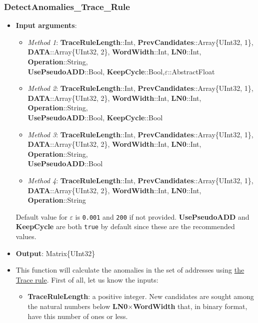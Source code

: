  \subsubsection*{DetectAnomalies\_Trace\_Rule}\label{Fun:DetectAnomaliesTraceRule}
 \begin{itemize}
	 \item \textbf{Input arguments}: 
	 \begin{itemize}
	 	\item \textit{Method 1}: \textbf{TraceRuleLength}::Int, 
	 	\textbf{PrevCandidates}::Array\{UInt32, 1\}, \\ \textbf{DATA}::Array\{UInt32, 2\}, \textbf{WordWidth}::Int, \textbf{LN0}::Int,  \textbf{Operation}::String, \\ \textbf{UsePseudoADD}::Bool, \textbf{KeepCycle}::Bool,\textbf{\(\varepsilon\)}::AbstractFloat
	 	\item \textit{Method 2}: \textbf{TraceRuleLength}::Int,
	 	\textbf{PrevCandidates}::Array\{UInt32, 1\}, \\ \textbf{DATA}::Array\{UInt32, 2\}, \textbf{WordWidth}::Int, \textbf{LN0}::Int,  \textbf{Operation}::String, \\ \textbf{UsePseudoADD}::Bool, \textbf{KeepCycle}::Bool
	 	\item \textit{Method 3}: \textbf{TraceRuleLength}::Int,
	 	\textbf{PrevCandidates}::Array\{UInt32, 1\}, \\ \textbf{DATA}::Array\{UInt32, 2\}, \textbf{WordWidth}::Int, \textbf{LN0}::Int,  \textbf{Operation}::String, \\ \textbf{UsePseudoADD}::Bool
	 	\item \textit{Method 4}: \textbf{TraceRuleLength}::Int,
	 	\textbf{PrevCandidates}::Array\{UInt32, 1\}, \\ \textbf{DATA}::Array\{UInt32, 2\}, \textbf{WordWidth}::Int, \textbf{LN0}::Int,  \textbf{Operation}::String
	 \end{itemize}
	 Default value for \textbf{\(\varepsilon\)} is \texttt{0.001} and \texttt{200} if  not provided.  \textbf{UsePseudoADD} and \textbf{KeepCycle} are both \texttt{true} by default since these are the recommended values.
	 \item \textbf{Output}: Matrix\{UInt32\}
	 \item This function will calculate the anomalies in the set of addresses using \hyperref[Subsec:TraceRule]{the Trace rule}. 
	 First of all, let us know the inputs:
	 \begin{itemize}
	 	\item \textbf{TraceRuleLength}: a positive integer. New candidates are sought among the natural numbers below \textbf{LN0}\(\times\)\textbf{WordWidth} that, in binary format, have this number of ones or less.
	 	

\end{itemize}
\end{itemize}

